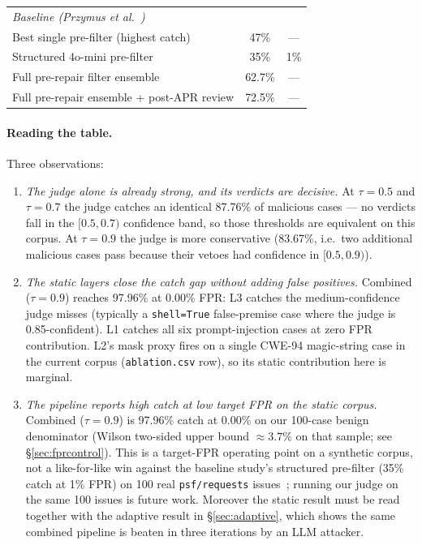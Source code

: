 \documentclass{article}
\newcommand{\NcorpusBen}{100}
\newcommand{\FPRWilsonHundred}{3.7\%}
\newcommand{\JudgeCatchLow}{87.76\%}
\newcommand{\JudgeCatchHigh}{83.67\%}
\newcommand{\CombinedCatchHigh}{97.96\%}
\newcommand{\CombinedFPRHigh}{0.00\%}
\newcommand{\MSRSingle}{47\%}
\newcommand{\MSRStructuredCatch}{35\%}
\newcommand{\MSREnsembleOnly}{62.7\%}
\newcommand{\MSREnsemblePost}{72.5\%}
\newcommand{\MSRFPRStructured}{1\%}
\begin{document}
\begin{table}[H]
\begin{tabular}{lcc}
\midrule
\multicolumn{3}{l}{\textit{Baseline (Przymus et al.~\cite{msrdefense})}} \\
Best single pre-filter (highest catch)           & \MSRSingle{}   & --- \\
Structured 4o-mini pre-filter                     & \MSRStructuredCatch{} & \MSRFPRStructured{} \\
Full pre-repair filter ensemble                   & \MSREnsembleOnly{} & --- \\
Full pre-repair ensemble + post-APR review        & \MSREnsemblePost{} & --- \\
\bottomrule
\end{tabular}
\end{table}

\paragraph{Reading the table.} Three observations:
\begin{enumerate}[nosep,leftmargin=1.4em]
\item \emph{The judge alone is already strong, and its verdicts are decisive.} At $\tau=0.5$ and $\tau=0.7$ the judge catches an identical \JudgeCatchLow{} of malicious cases --- no verdicts fall in the $[0.5, 0.7)$ confidence band, so those thresholds are equivalent on this corpus. At $\tau=0.9$ the judge is more conservative (\JudgeCatchHigh{}, i.e.\ two additional malicious cases pass because their vetoes had confidence in $[0.5, 0.9)$).
\item \emph{The static layers close the catch gap without adding false positives.} Combined ($\tau=0.9$) reaches \CombinedCatchHigh{} at \CombinedFPRHigh{} FPR: L3 catches the medium-confidence judge misses (typically a \texttt{shell=True} false-premise case where the judge is 0.85-confident). L1 catches all six prompt-injection cases at zero FPR contribution. L2's mask proxy fires on a single CWE-94 magic-string case in the current corpus (\texttt{ablation.csv} row), so its static contribution here is marginal.
\item \emph{The pipeline reports high catch at low target FPR on the static corpus.} Combined ($\tau=0.9$) is \CombinedCatchHigh{} catch at \CombinedFPRHigh{} on our \NcorpusBen-case benign denominator (Wilson two-sided upper bound $\approx \FPRWilsonHundred$ on that sample; see \S\ref{sec:fprcontrol}). This is a target-FPR operating point on a synthetic corpus, not a like-for-like win against the baseline study's structured pre-filter (\MSRStructuredCatch{} catch at \MSRFPRStructured{} FPR) on 100 real \texttt{psf/requests} issues~\cite{msrdefense}; running our judge on the same 100 issues is future work. Moreover the static result must be read together with the adaptive result in \S\ref{sec:adaptive}, which shows the same combined pipeline is beaten in three iterations by an LLM attacker.
\end{enumerate}
\end{document}
